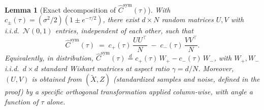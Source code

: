\documentclass{article}
\newtheorem{lemma}{Lemma}
\begin{document}
\begin{lemma}[Exact decomposition of $\hat C^{\mathrm{sym}}(\tau)$]
\label{lem:decomp}
With $c_\pm(\tau) = (\sigma^2/2)(1 \pm e^{-\tau/2})$, there exist
$d\times N$ random matrices $U, V$ with i.i.d.\ $\mathcal N(0,1)$
entries, independent of each other, such that
\begin{equation}
\hat C^{\mathrm{sym}}(\tau) \;=\; c_+(\tau)\,\frac{UU^\top}{N} \;-\; c_-(\tau)\,\frac{VV^\top}{N}.
\label{eq:wishart-decomp}
\end{equation}
Equivalently, in distribution, $\hat C^{\mathrm{sym}}(\tau) \stackrel{d}{=} c_+(\tau)\,W_+ - c_-(\tau)\,W_-$,
with $W_+,W_-$ i.i.d.\ $d\times d$ standard Wishart matrices at aspect
ratio $\gamma = d/N$. Moreover, $(U, V)$ is obtained from $(\tilde X, Z)$
(standardized samples and noise, defined in the proof) by a specific
orthogonal transformation applied column-wise, with angle a function of
$\tau$ alone.
\end{lemma}
\end{document}
